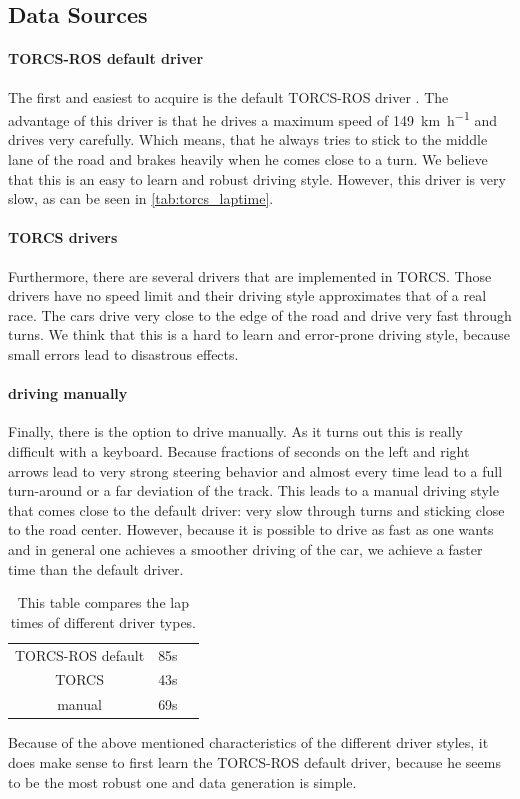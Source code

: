 \documentclass[10pt,a4paper,twoside,journal]{IEEEtran}
\begin{document}
\subsection{Data Sources}
\paragraph{TORCS-ROS default driver}
The first and easiest to acquire is the default TORCS-ROS driver \cite{mirus_torcs-ros_2017}. The advantage of this driver is that he drives a maximum speed of \SI{149}{\km\per\hour} and drives very carefully. Which means, that he always tries to stick to the middle lane of the road and brakes heavily when he comes close to a turn. We believe that this is an easy to learn and robust driving style. However, this driver is very slow, as can be seen in \autoref{tab:torcs_laptime}.
\paragraph{TORCS drivers}
Furthermore, there are several drivers that are implemented in TORCS. Those drivers have no speed limit and their driving style approximates that of a real race. The cars drive very close to the edge of the road and drive very fast through turns. We think that this is a hard to learn and error-prone driving style, because small errors lead to disastrous effects.
\paragraph{driving manually}
Finally, there is the option to drive manually. As it turns out this is really difficult with a keyboard. Because fractions of seconds on the left and right arrows lead to very strong steering behavior and almost every time lead to a full turn-around or a far deviation of the track. This leads to a manual driving style that comes close to the default driver: very slow through turns and sticking close to the road center. However, because it is possible to drive as fast as one wants and in general one achieves a smoother driving of the car, we achieve a faster time than the default driver. \\
\begin{table}[ht]
	\begin{center}
		\begin{tabular}{ |c|c|c| } 
			\hline
			TORCS-ROS default & 85s \\
			TORCS  & 43s  \\
			manual & 69s \\
			\hline
		\end{tabular}
		\caption{\label{tab:torcs_laptime}This table compares the lap times of different driver types.}
	\end{center}
\end{table}
Because of the above mentioned characteristics of the different driver styles, it does make sense to first learn the TORCS-ROS default driver, because he seems to be the most robust one and data generation is simple.
\end{document}
